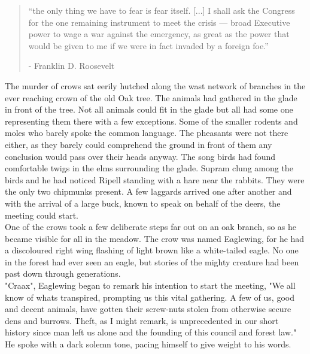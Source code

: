 \documentclass[smalldemyvopaper,11pt,twoside,onecolumn,openright,extrafontsizes]{memoir}
\begin{document}
\vspace{-1.3cm}
\begin{localsize}{10}
	\begin{quote}
		“the only thing we have to fear is fear itself. [...] I shall ask the Congress for the one remaining instrument to meet the crisis — broad Executive power to wage a war against the emergency, as great as the power that would be given to me if we were in fact invaded by a foreign foe.”
		\begin{flushright}- Franklin D. Roosevelt \end{flushright}
	\end{quote} 
\end{localsize}
\vspace{1cm}

The murder of crows sat eerily hutched along the wast network of branches in the ever reaching crown of the old Oak tree. The animals had gathered in the glade in front of the tree. Not all animals could fit in the glade but all had some one representing them there with a few exceptions. Some of the smaller rodents and moles who barely spoke the common language. The pheasants were not there either, as they barely could comprehend the ground in front of them any conclusion would pass over their heads anyway. The song birds had found comfortable twigs in the elms surrounding the glade. Supram clung among the birds and he had noticed Ripell standing with a hare near the rabbits. They were the only two chipmunks present. A few laggards arrived one after another and with the arrival of a large buck, known to speak on behalf of the deers, the meeting could start. \\

One of the crows took a few deliberate steps far out on an oak branch, so as he became visible for all in the meadow. The crow was named Eaglewing, for he had a discoloured right wing flashing of light brown like a white-tailed eagle. No one in the forest had ever seen an eagle, but stories of the mighty creature had been past down through generations.\\

"Craax", Eaglewing began to remark his intention to start the meeting, "We all know of whats transpired, prompting us this vital gathering. A few of us, good and decent animals, have gotten their screw-nuts stolen from otherwise secure dens and burrows. Theft, as I might remark, is unprecedented in our short history since man left us alone and the founding of this council and forest law." He spoke with a dark solemn tone, pacing himself to give weight to his words.
\end{document}
